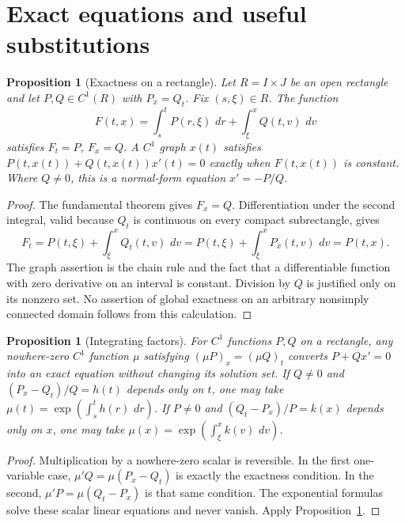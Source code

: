 \documentclass[11pt,oneside]{book}
\newtheorem{proposition}[theorem]{Proposition}
\theoremstyle{definition}
\theoremstyle{remark}\newtheorem{remark}[theorem]{Remark}
\newcommand{\dd}{\,d}\newcommand{\id}{\operatorname{id}}
\begin{document}
\section{Exact equations and useful substitutions}
\begin{proposition}[Exactness on a rectangle]\label{d13:02:exact}
Let $R=I\times J$ be an open rectangle and let $P,Q\in C^1(R)$ with
$P_x=Q_t$. Fix $(s,\xi)\in R$. The function
\[
 F(t,x)=\int_s^t P(r,\xi)\,\dd r+\int_\xi^x Q(t,v)\,\dd v
\]
satisfies $F_t=P$, $F_x=Q$. A $C^1$ graph $x(t)$ satisfies
$P(t,x(t))+Q(t,x(t))x'(t)=0$ exactly when $F(t,x(t))$ is constant.
Where $Q\ne0$, this is a normal-form equation $x'=-P/Q$.
\end{proposition}
\begin{proof}
The fundamental theorem gives $F_x=Q$. Differentiation under the second
integral, valid because $Q_t$ is continuous on every compact subrectangle,
gives
\[
 F_t=P(t,\xi)+\int_\xi^x Q_t(t,v)\,\dd v
     =P(t,\xi)+\int_\xi^x P_x(t,v)\,\dd v=P(t,x).
\]
The graph assertion is the chain rule and the fact that a differentiable
function with zero derivative on an interval is constant. Division by $Q$
is justified only on its nonzero set. No assertion of global exactness on
an arbitrary nonsimply connected domain follows from this calculation.
\end{proof}

\begin{proposition}[Integrating factors]\label{d13:02:integrating-factor}
For $C^1$ functions $P,Q$ on a rectangle, any nowhere-zero $C^1$
function $\mu$ satisfying $(\mu P)_x=(\mu Q)_t$ converts
$P+Qx'=0$ into an exact equation without changing its solution set.
If $Q\ne0$ and $(P_x-Q_t)/Q=h(t)$ depends only on $t$, one may take
$\mu(t)=\exp(\int_s^t h(r)\,\dd r)$. If $P\ne0$ and
$(Q_t-P_x)/P=k(x)$ depends only on $x$, one may take
$\mu(x)=\exp(\int_\xi^x k(v)\,\dd v)$.
\end{proposition}
\begin{proof}
Multiplication by a nowhere-zero scalar is reversible. In the first
one-variable case, $\mu'Q=\mu(P_x-Q_t)$ is exactly the exactness
condition. In the second, $\mu'P=\mu(Q_t-P_x)$ is that same condition.
The exponential formulas solve these scalar linear equations and never
vanish. Apply Proposition~\ref{d13:02:exact}.
\end{proof}
\end{document}
